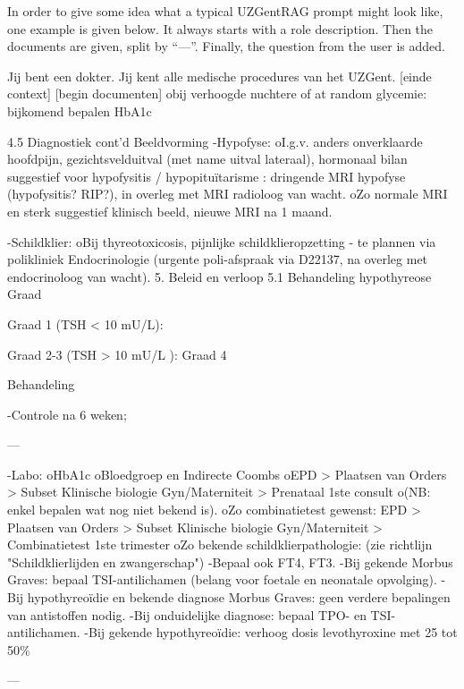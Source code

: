 In order to give some idea what a typical UZGentRAG prompt might look like, one example is given below. It always starts with a role description. Then the documents are given, split by ``---''. Finally, the question from the user is added.

\begin{wrapverbatim}
Jij bent een dokter. Jij kent alle medische procedures van het UZGent.
[einde context]
[begin documenten]
obij verhoogde nuchtere of at random glycemie: bijkomend bepalen HbA1c
 
4.5 Diagnostiek cont'd 
Beeldvorming 
-Hypofyse:
oI.g.v. anders onverklaarde hoofdpijn, gezichtsvelduitval (met name uitval lateraal), 
hormonaal bilan suggestief voor hypofysitis / hypopituïtarisme : dringende MRI hypofyse 
(hypofysitis? RIP?), in overleg met MRI radioloog van wacht.
oZo normale MRI en sterk suggestief klinisch beeld, nieuwe MRI na 1 maand.
 
-Schildklier:
oBij thyreotoxicosis, pijnlijke schildklieropzetting - te plannen via polikliniek Endocrinologie 
(urgente poli-afspraak via D22137, na overleg met endocrinoloog van wacht).
5. Beleid en verloop
5.1 Behandeling hypothyreose
Graad
 
Graad 1
(TSH < 10 mU/L): 
 
Graad 2-3
(TSH > 10 mU/L ): Graad 4
 
 
Behandeling
 
-Controle na 6 weken;

---

-Labo:
oHbA1c
oBloedgroep en Indirecte Coombs
oEPD >  Plaatsen van Orders > Subset Klinische biologie Gyn/Materniteit > Prenataal 1ste 
consult
o(NB: enkel bepalen wat nog niet bekend is).
oZo combinatietest gewenst: EPD >  Plaatsen van Orders > Subset Klinische biologie 
Gyn/Materniteit > Combinatietest 1ste trimester
oZo bekende schildklierpathologie: (zie richtlijn "Schildklierlijden en zwangerschap")
-Bepaal ook FT4, FT3.
-Bij gekende Morbus Graves: bepaal TSI-antilichamen (belang voor foetale en neonatale 
opvolging).
-Bij hypothyreoïdie en bekende diagnose Morbus Graves: geen verdere bepalingen van 
antistoffen nodig.
-Bij onduidelijke diagnose: bepaal TPO- en TSI-antilichamen.
-Bij gekende hypothyreoïdie: verhoog dosis levothyroxine met 25 tot 50\%

---


\end{wrapverbatim}
